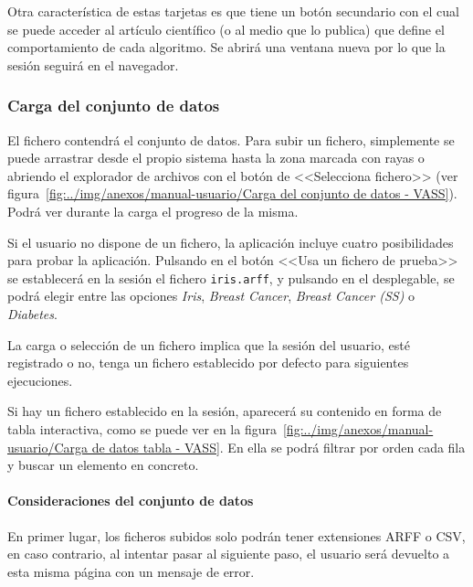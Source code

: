 Otra característica de estas tarjetas es que tiene un botón secundario con el cual se puede acceder al artículo científico (o al medio que lo publica) que define el comportamiento de cada algoritmo. Se abrirá una ventana nueva por lo que la sesión seguirá en el navegador.

\subsubsection{Carga del conjunto de datos}

El fichero contendrá el conjunto de datos. Para subir un fichero, simplemente se
puede arrastrar desde el propio sistema hasta la zona marcada con rayas o
abriendo el explorador de archivos con el botón de <<Selecciona fichero>> (ver
figura~\ref{fig:../img/anexos/manual-usuario/Carga del conjunto de datos - VASS}).
Podrá ver durante la carga el progreso de la misma.


Si el usuario no dispone de un fichero, la aplicación incluye cuatro posibilidades para probar la aplicación. Pulsando en el botón <<Usa un fichero de prueba>> se establecerá en la sesión el fichero \texttt{iris.arff}, y pulsando en el desplegable, se podrá elegir entre las opciones \textit{Iris}, \textit{Breast Cancer}, \textit{Breast Cancer (SS)} o \textit{Diabetes}.

La carga o selección de un fichero implica que la sesión del usuario, esté registrado o no, tenga un fichero establecido por defecto para siguientes ejecuciones.

Si hay un fichero establecido en la sesión, aparecerá su contenido en forma de tabla interactiva, como se puede ver en la figura~\ref{fig:../img/anexos/manual-usuario/Carga de datos tabla - VASS}. En ella se podrá filtrar por orden cada fila y buscar un elemento en concreto.


\paragraph{Consideraciones del conjunto de datos} En primer lugar, los ficheros
subidos solo podrán tener extensiones ARFF o CSV, en caso contrario, al intentar
pasar al siguiente paso, el usuario será devuelto a esta misma página con un
mensaje de error.


